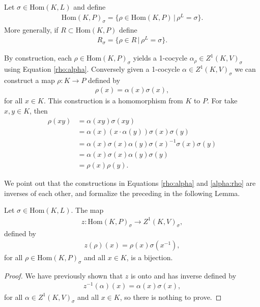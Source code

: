 \begin{definition} Let $\sigma \in \mathrm{Hom}(K, L)$ and define
\begin{align*} \mathrm{Hom}(K, P)_\sigma = \{ \rho \in \mathrm{Hom}(K, P) \,|\, \rho^L = \sigma\}. \end{align*}
More generally, if $R \subset \mathrm{Hom}(K, P)$ define
\begin{align*} R_\sigma = \{ \rho \in R \,|\, \rho^L = \sigma \}. \end{align*}
\end{definition}

By construction, each $\rho \in \mathrm{Hom}(K, P)_\sigma$ yields a 1-cocycle $\alpha_\rho \in Z^1(K, V)_\sigma$ using Equation \ref{rho:alpha}.
Conversely given a 1-cocycle $\alpha \in Z^1(K, V)_\sigma$ we can construct a map $\rho: K \rightarrow P$ defined by
\begin{align}\label{alpha:rho}
\rho(x) = \alpha(x)\sigma(x),
\end{align}
for all $x \in K$. This construction is a homomorphism from $K$ to $P$. For take $x, y \in K$, then
\begin{align*}
  \rho(x y) &= \alpha(x y) \sigma(x y) \\
  &= \alpha(x)(x \cdot \alpha(y)) \sigma(x) \sigma(y) \\
  &= \alpha(x) \sigma(x) \alpha(y) \sigma(x)^{-1} \sigma(x) \sigma(y) \\
  &= \alpha(x) \sigma(x) \alpha(y) \sigma(y) \\
  &= \rho(x) \rho(y).
\end{align*}

We point out that the constructions in Equations \ref{rho:alpha} and \ref{alpha:rho} are inverses of each other, and formalize the preceding in the following Lemma.

\begin{lemma}
  Let $\sigma \in \mathrm{Hom}(K, L)$. The map
\begin{align*} z: \mathrm{Hom}(K, P)_{\sigma} \rightarrow Z^1(K, V)_\sigma, \end{align*}
defined by
\begin{align*} z(\rho)(x) = \rho(x)\sigma(x^{-1}), \end{align*}
for all $\rho \in \mathrm{Hom}(K, P)_\sigma$ and all $x \in K$, is a bijection.
\label{lem:hom_z1}
\end{lemma}
\begin{proof}
We have previously shown that $z$ is onto and has inverse defined by
\begin{align*} z^{-1}(\alpha)(x) = \alpha(x)\sigma(x), \end{align*}
for all $\alpha \in Z^1(K, V)_\sigma$ and all $x \in K$, so there is nothing to prove.
\end{proof}

